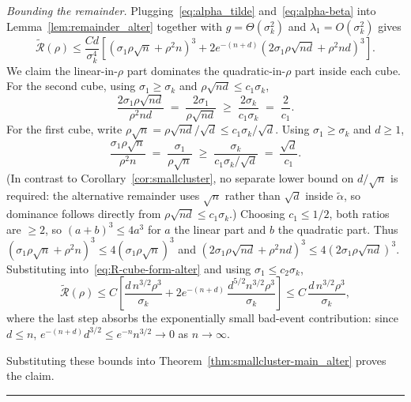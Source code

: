 \documentclass{article}
\newcommand{\Rcal}{\mathcal{R}}
\newcommand{\BlackBox}{\rule{1.5ex}{1.5ex}}  %
\newenvironment{proof}{\par\noindent{\bf Proof\ }}{\hfill\BlackBox\par\medskip}
\newcommand{\rbr}[1]{\left(#1\right)}
\newcommand{\sbr}[1]{\left[#1\right]}
\begin{document}
\begin{proof}
\emph{Bounding the remainder.} Plugging~\eqref{eq:alpha_tilde} and~\eqref{eq:alpha-beta} into Lemma~\ref{lem:remainder_alter} together with $g = \Theta(\sigma_k^2)$ and $\lambda_1 = O(\sigma_k^2)$ gives
\begin{equation}\label{eq:R-cube-form-alter}
    \tilde{\Rcal}(\rho) \le \frac{Cd}{\sigma_k^4}\sbr{\rbr{\sigma_1\rho\sqrt n + \rho^2 n}^3 + 2 e^{-(n+d)}\rbr{2\sigma_1\rho\sqrt{nd}+\rho^2 nd}^3}.
\end{equation}
We claim the linear-in-$\rho$ part dominates the quadratic-in-$\rho$ part inside each cube. For the second cube, using $\sigma_1 \ge \sigma_k$ and $\rho\sqrt{nd} \le c_1\sigma_k$,
\begin{equation*}
    \frac{2\sigma_1\rho\sqrt{nd}}{\rho^2 nd} \;=\; \frac{2\sigma_1}{\rho\sqrt{nd}} \;\ge\; \frac{2\sigma_k}{c_1\sigma_k} \;=\; \frac{2}{c_1}.
\end{equation*}
For the first cube, write $\rho\sqrt n = \rho\sqrt{nd}/\sqrt d \le c_1\sigma_k/\sqrt d$. Using $\sigma_1 \ge \sigma_k$ and $d \ge 1$,
\begin{equation*}
    \frac{\sigma_1\rho\sqrt n}{\rho^2 n} \;=\; \frac{\sigma_1}{\rho\sqrt n} \;\ge\; \frac{\sigma_k}{c_1\sigma_k/\sqrt d} \;=\; \frac{\sqrt d}{c_1}.
\end{equation*}
(In contrast to Corollary~\ref{cor:smallcluster}, no separate lower bound on $d/\sqrt n$ is required: the alternative remainder uses $\sqrt n$ rather than $\sqrt d$ inside $\tilde\alpha$, so dominance follows directly from $\rho\sqrt{nd}\le c_1\sigma_k$.) Choosing $c_1 \le 1/2$, both ratios are $\ge 2$, so $(a+b)^3 \le 4 a^3$ for $a$ the linear part and $b$ the quadratic part. Thus $(\sigma_1\rho\sqrt n + \rho^2 n)^3 \le 4(\sigma_1\rho\sqrt n)^3$ and $(2\sigma_1\rho\sqrt{nd} + \rho^2 nd)^3 \le 4(2\sigma_1\rho\sqrt{nd})^3$. Substituting into~\eqref{eq:R-cube-form-alter} and using $\sigma_1 \le c_2\sigma_k$,
\begin{equation*}
    \tilde{\Rcal}(\rho) \le C\sbr{\frac{d\, n^{3/2}\rho^3}{\sigma_k} + 2 e^{-(n+d)}\,\frac{d^{5/2} n^{3/2}\rho^3}{\sigma_k}} \le C\,\frac{d\, n^{3/2}\rho^3}{\sigma_k},
\end{equation*}
where the last step absorbs the exponentially small bad-event contribution: since $d \le n$, $e^{-(n+d)} d^{3/2} \le e^{-n} n^{3/2} \to 0$ as $n \to \infty$.

Substituting these bounds into Theorem~\ref{thm:smallcluster-main_alter} proves the claim.
\end{proof}

% 
\end{document}
